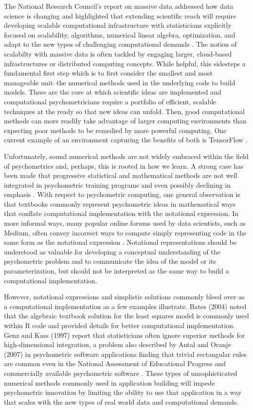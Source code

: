 \documentclass[12pt]{article}
\begin{document}
The National Research Council's report on massive data addressed how data science is changing and highlighted that extending scientific reach will require developing scalable computational infrastructure with statisticians explicitly focused on scalability, algorithms, numerical linear algebra, optimization, and adapt to the new types of challenging computational demands \cite{massive}. The notion of scalabilty with massive data is often tackled by engaging larger, cloud-based infrastructures or distributed computing concepts. While helpful, this sidesteps a fundamental first step which is to first consider the smallest and most manageable unit--the numerical methods used in the underlying code to build models. These are the core at which scientific ideas are implemented and computational psychometricians require a portfolio of efficient, scalable techniques at the ready so that new ideas can unfold. Then, good computational methods can more readily take advantage of larger computing environments than expecting poor methods to be remedied by more powerful computing. One current example of an environment capturing the benefits of both is TensorFlow \cite{tensorflow2015-whitepaper}.  

Unfortunately, sound numerical methods are not widely embraced within the field of psychometrics and, perhaps, this is rooted in how we learn. A strong case has been made that progressive statistical and mathematical methods are not well integrated in psychometric training programs and even possibly declining in emphasis \cite{aiken,townsend}. With respect to psychometric computing, one general observation is that textbooks commonly represent psychometric ideas in mathematical ways that conflate computational implementation with the notational expression. In more informal ways, many popular online forums used by data scientists, such as Medium, often convey incorrect ways to compute simply representing code in the same form as the notational expression \cite{Koseoglu}. Notational representations should be understood as valuable for developing a conceptual understanding of the psychometric problem and to communicate the idea of the model or its parameterization, but should not be interpreted as the same way to build a computational implementation. 

However, notational expressions and simplistic solutions commonly bleed over as a computational implementation as a few examples illustrate. Bates (2004)\nocite{Rnews:Bates:2004} noted that the algebraic textbook solution for the least squares model is commonly used within R code and provided details for better computational implementation. Genz and Kass (1997) report that statisticians often ignore superior methods for high-dimensional integration, a problem also described by Antal and Oranje (2007) in psychometric software applications finding that trivial rectangular rules are common even in the National Assessment of Educational Progress \cite{nces} and commercially available psychometric software \cite{parscale}. These types of unsophisticated numerical methods commonly used in application building will impede psychometric innovation by limiting the ability to use that application in a way that scales with the new types of real world data and computational demands. \nocite{genz, ets:2007}
\end{document}
